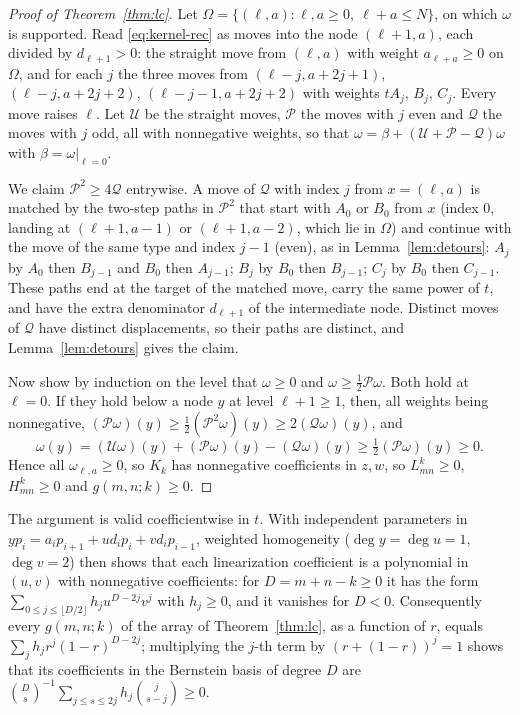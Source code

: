 \begin{proof}[Proof of Theorem~\ref{thm:lc}]
Let $\Omega=\{(\ell,a):\ell,a\geq0,\ \ell+a\leq N\}$, on which $\omega$ is supported. Read \eqref{eq:kernel-rec} as moves into the node $(\ell+1,a)$, each divided by $d_{\ell+1}>0$: the straight move from $(\ell,a)$ with weight $a_{\ell+a}\geq0$ on $\Omega$, and for each $j$ the three moves from $(\ell-j,a+2j+1)$, $(\ell-j,a+2j+2)$, $(\ell-j-1,a+2j+2)$ with weights $tA_j$, $B_j$, $C_j$. Every move raises $\ell$. Let $\mathcal U$ be the straight moves, $\mathcal P$ the moves with $j$ even and $\mathcal Q$ the moves with $j$ odd, all with nonnegative weights, so that $\omega=\beta+(\mathcal U+\mathcal P-\mathcal Q)\omega$ with $\beta=\omega|_{\ell=0}$.

We claim $\mathcal P^2\geq4\mathcal Q$ entrywise. A move of $\mathcal Q$ with index $j$ from $x=(\ell,a)$ is matched by the two-step paths in $\mathcal P^2$ that start with $A_0$ or $B_0$ from $x$ (index $0$, landing at $(\ell+1,a-1)$ or $(\ell+1,a-2)$, which lie in $\Omega$) and continue with the move of the same type and index $j-1$ (even), as in Lemma~\ref{lem:detours}: $A_j$ by $A_0$ then $B_{j-1}$ and $B_0$ then $A_{j-1}$; $B_j$ by $B_0$ then $B_{j-1}$; $C_j$ by $B_0$ then $C_{j-1}$. These paths end at the target of the matched move, carry the same power of $t$, and have the extra denominator $d_{\ell+1}$ of the intermediate node. Distinct moves of $\mathcal Q$ have distinct displacements, so their paths are distinct, and Lemma~\ref{lem:detours} gives the claim.

Now show by induction on the level that $\omega\geq0$ and $\omega\geq\frac12\mathcal P\omega$. Both hold at $\ell=0$. If they hold below a node $y$ at level $\ell+1\geq1$, then, all weights being nonnegative, $(\mathcal P\omega)(y)\geq\frac12(\mathcal P^2\omega)(y)\geq2(\mathcal Q\omega)(y)$, and
\[
\omega(y)=(\mathcal U\omega)(y)+(\mathcal P\omega)(y)-(\mathcal Q\omega)(y)\geq\tfrac12(\mathcal P\omega)(y)\geq0.
\]
Hence all $\omega_{\ell,a}\geq0$, so $K_k$ has nonnegative coefficients in $z,w$, so $L_{mn}^k\geq0$, $H_{mn}^k\geq0$ and $g(m,n;k)\geq0$.
\end{proof}

\begin{remark}\label{rem:bernstein}
The argument is valid coefficientwise in $t$. With independent parameters in $yp_i=a_ip_{i+1}+ud_ip_i+vd_ip_{i-1}$, weighted homogeneity ($\deg y=\deg u=1$, $\deg v=2$) then shows that each linearization coefficient is a polynomial in $(u,v)$ with nonnegative coefficients: for $D=m+n-k\geq0$ it has the form $\sum_{0\leq j\leq\lfloor D/2\rfloor}h_ju^{D-2j}v^j$ with $h_j\geq0$, and it vanishes for $D<0$. Consequently every $g(m,n;k)$ of the array of Theorem~\ref{thm:lc}, as a function of $r$, equals $\sum_jh_jr^j(1-r)^{D-2j}$; multiplying the $j$-th term by $(r+(1-r))^j=1$ shows that its coefficients in the Bernstein basis of degree $D$ are $\binom Ds^{-1}\sum_{j\leq s\leq2j}h_j\binom j{s-j}\geq0$.
\end{remark}

